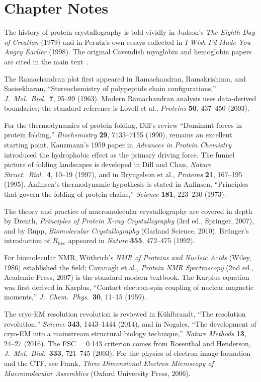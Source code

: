 \section*{Chapter Notes}
\label{sec:ch01-notes}

The history of protein crystallography is told vividly in Judson's \textit{The Eighth Day of Creation} (1979) and in Perutz's own essays collected in \textit{I Wish I'd Made You Angry Earlier} (1998).  The original Cavendish myoglobin and hemoglobin papers are cited in the main text~\cite{kendrew1958,kendrew1960,perutz1960}.

The Ramachandran plot first appeared in Ramachandran, Ramakrishnan, and Sasisekharan, ``Stereochemistry of polypeptide chain configurations,'' \textit{J.~Mol.~Biol.}\ \textbf{7}, 95--99 (1963).  Modern Ramachandran analysis uses data-derived boundaries; the standard reference is Lovell et al., \textit{Proteins} \textbf{50}, 437--450 (2003).

For the thermodynamics of protein folding, Dill's review ``Dominant forces in protein folding,'' \textit{Biochemistry} \textbf{29}, 7133--7155 (1990), remains an excellent starting point.  Kauzmann's 1959 paper in \textit{Advances in Protein Chemistry} introduced the hydrophobic effect as the primary driving force.  The funnel picture of folding landscapes is developed in Dill and Chan, \textit{Nature Struct.~Biol.}\ \textbf{4}, 10--19 (1997), and in Bryngelson et al., \textit{Proteins} \textbf{21}, 167--195 (1995).  Anfinsen's thermodynamic hypothesis is stated in Anfinsen, ``Principles that govern the folding of protein chains,'' \textit{Science} \textbf{181}, 223--230 (1973).

The theory and practice of macromolecular crystallography are covered in depth by Drenth, \textit{Principles of Protein X-ray Crystallography} (3rd ed., Springer, 2007), and by Rupp, \textit{Biomolecular Crystallography} (Garland Science, 2010).  Br\"unger's introduction of $R_{\text{free}}$ appeared in \textit{Nature} \textbf{355}, 472--475 (1992).

For biomolecular NMR, W\"uthrich's \textit{NMR of Proteins and Nucleic Acids} (Wiley, 1986) established the field; Cavanagh et al., \textit{Protein NMR Spectroscopy} (2nd ed., Academic Press, 2007) is the standard modern textbook.  The Karplus equation was first derived in Karplus, ``Contact electron-spin coupling of nuclear magnetic moments,'' \textit{J.~Chem.~Phys.}\ \textbf{30}, 11--15 (1959).

The cryo-EM resolution revolution is reviewed in K\"uhlbrandt, ``The resolution revolution,'' \textit{Science} \textbf{343}, 1443--1444 (2014), and in Nogales, ``The development of cryo-EM into a mainstream structural biology technique,'' \textit{Nature Methods} \textbf{13}, 24--27 (2016).  The FSC = 0.143 criterion comes from Rosenthal and Henderson, \textit{J.~Mol.~Biol.}\ \textbf{333}, 721--745 (2003).  For the physics of electron image formation and the CTF, see Frank, \textit{Three-Dimensional Electron Microscopy of Macromolecular Assemblies} (Oxford University Press, 2006).
